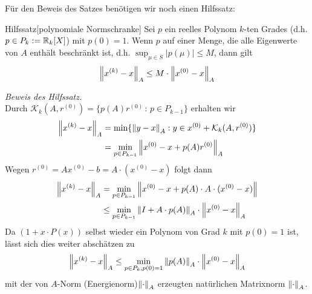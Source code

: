 Für den Beweis des Satzes benötigen wir noch einen Hilfssatz:
\begin{colbox}{Hilfssatz}[polynomiale Normschranke]
  Sei $p$ ein reelles Polynom $k$-ten Grades (d.h.$p\in P_k:=\mathbb R_k[X]$) mit $p(0)=1$.
  Wenn $p$ auf einer Menge, die alle Eigenwerte von $A$ enthält beschränkt ist, d.h. 
  $\sup_{\mu\in S} |p(\mu)| \leq M$, dann gilt 
  \begin{align*}
    \vertn{2}{x^{(k)} - x}_A 
    \leq M\cdot\vertn{2}{x^{(0)}-x}_A
  \end{align*}
\end{colbox}

\textit{Beweis des Hilfssatz.} \\
Durch $\mathcal{K}_k(A,r^{(0)}) = \{p(A)r^{(0)} \,:\, p\in P_{k-1}\}$ erhalten wir 
%
\begin{align*}
  \vertn{2}{x^{(k)}-x}_A 
  &= \min\{\vertn{2}{y-x}_A : y\in x^{(0)}+\mathcal{K}_k(A,r^{(0)})\} \\
  &= \min_{p\in P_{k-1}}\vertn{2}{x^{(0)}-x+p(A)r^{(0)}}_A
\end{align*}
%
Wegen $r^{(0)} = Ax^{(0)}-b = A\cdot(x^{(0)}-x)$ folgt dann 
%
\begin{align*}
  \vertn{2}{x^{(k)}-x}_A 
  &= \min_{p\in P_{k-1}} \vertn{2}{x^{(0)} - x + p(A)\cdot A\cdot(x^{(0)}-x)}\\
  &\leq \min_{p\in P_{k-1}} \vertn{2}{I+A\cdot p(A)}_A\cdot\vertn{2}{x^{(0)}-x}_A 
\end{align*}
%
Da $(1+x\cdot P(x))$ selbst wieder ein Polynom von Grad $k$ mit $p(0)=1$ ist, lässt sich dies weiter abschätzen zu
%
\begin{align*}
  \vertn{2}{x^{(k)}-x}_A 
  \leq \min_{p\in P_{k}, p(0)=1} \vertn{2}{p(A)}_A\cdot\vertn{2}{x^{(0)}-x}_A 
\end{align*}
%
mit der von $A$-Norm (Energienorm)$\vertn{2}{\cdot}_A$ erzeugten natürlichen Matrixnorm $\vertn{2}{\cdot}_A$. 


